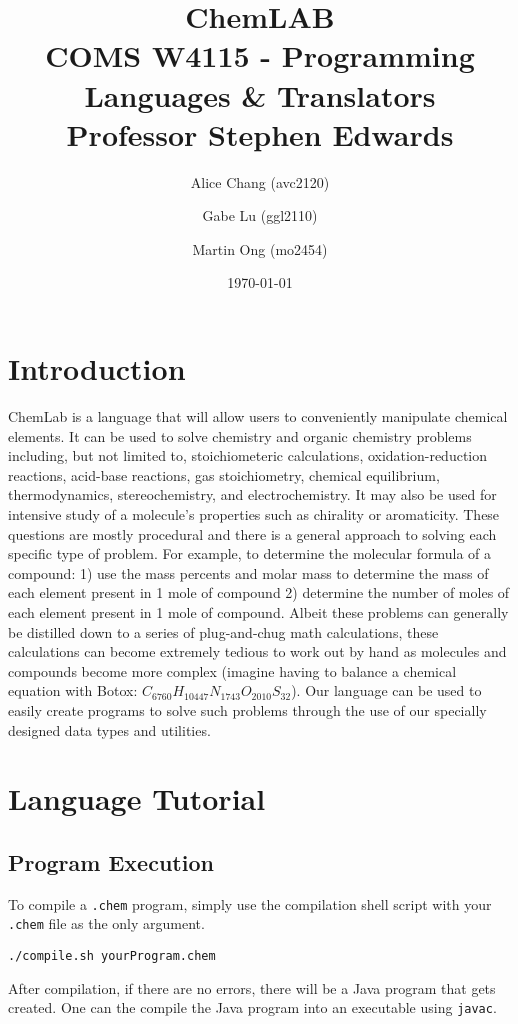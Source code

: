 \documentclass[11pt]{report}
\title{ChemLAB \\
COMS W4115 - Programming Languages \& Translators \\
Professor Stephen Edwards}
\author{Alice Chang (avc2120) \and Gabe Lu (ggl2110) \and Martin Ong (mo2454)}
\date{\today}                          %
\begin{document}
\maketitle
\tableofcontents

\chapter*{Introduction}
ChemLab is a language that will allow users to conveniently manipulate chemical elements. It can be used to solve chemistry and organic chemistry problems including, but not limited to,  stoichiometeric calculations, oxidation-reduction reactions, acid-base reactions, gas stoichiometry, chemical equilibrium, thermodynamics, stereochemistry, and electrochemistry. It may also be used for intensive study of a molecule's properties such as chirality or aromaticity. These questions are mostly procedural and there is a general approach to solving each specific type of problem. For example, to determine the molecular formula of a compound: 1) use the mass percents and molar mass to determine the mass of each element present in 1 mole of compound 2) determine the number of moles of each element present in 1 mole of compound. Albeit these problems can generally be distilled down to a series of plug-and-chug math calculations, these calculations can become extremely tedious to work out by hand as molecules and compounds become more complex (imagine having to balance a chemical equation with Botox: $C_{6760}H_{10447}N_{1743}O_{2010}S_{32}$). Our language can be used to easily create programs to solve such problems through the use of our specially designed data types and utilities.

\chapter{Language Tutorial}
\section{Program Execution}
To compile a \texttt{.chem} program, simply use the compilation shell script with your \texttt{.chem} file as the only argument.

\texttt{./compile.sh yourProgram.chem}

After compilation, if there are no errors, there will be a  Java program that gets created. One can the compile the Java program into an executable using \texttt{javac}. 
\end{document}
